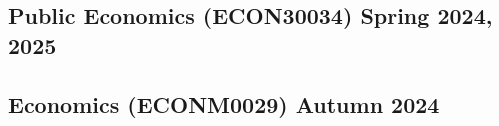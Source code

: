 \documentclass[a4paper, 12pt]{article}
\begin{document}
\subsection {Public Economics (ECON30034) \hfill Spring 2024, 2025}
\vspace*{12pt}
\subsection {Economics (ECONM0029) \hfill Autumn 2024}
\vspace*{5pt}
\end{document}
